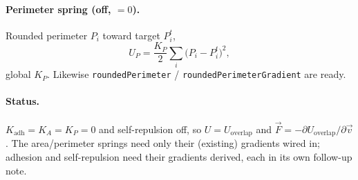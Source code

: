 \documentclass[11pt]{article}
\newcommand{\vv}[1]{\vec{#1}}
\begin{document}
\paragraph{Perimeter spring (off, $=0$).} Rounded perimeter $P_i$ toward target $P^{t}_i$,
\[
  U_{P}=\frac{K_{P}}{2}\sum_i\big(P_i-P^{t}_i\big)^2,
\]
global $K_{P}$. Likewise \texttt{roundedPerimeter} / \texttt{roundedPerimeterGradient} are ready.

\paragraph{Status.} $K_{\mathrm{adh}}=K_{A}=K_{P}=0$ and self-repulsion off, so $U=U_{\mathrm{overlap}}$
and $\vv F=-\partial U_{\mathrm{overlap}}/\partial\vv v$. The area/perimeter springs need only their
(existing) gradients wired in; adhesion and self-repulsion need their gradients derived, each in its
own follow-up note.
\end{document}
